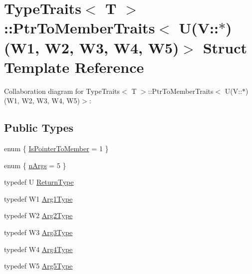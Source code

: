 \hypertarget{structTypeTraits_1_1PtrToMemberTraits_3_01U_07V_1_1_5_08_07W1_00_01W2_00_01W3_00_01W4_00_01W5_08_4}{}\section{Type\+Traits$<$ T $>$\+:\+:Ptr\+To\+Member\+Traits$<$ U(V\+:\+:$\ast$)(W1, W2, W3, W4, W5)$>$ Struct Template Reference}
\label{structTypeTraits_1_1PtrToMemberTraits_3_01U_07V_1_1_5_08_07W1_00_01W2_00_01W3_00_01W4_00_01W5_08_4}


Collaboration diagram for Type\+Traits$<$ T $>$\+:\+:Ptr\+To\+Member\+Traits$<$ U(V\+:\+:$\ast$)(W1, W2, W3, W4, W5)$>$\+:
\subsection*{Public Types}
\begin{DoxyCompactItemize}
\item 
enum \{ \hyperlink{structTypeTraits_1_1PtrToMemberTraits_3_01U_07V_1_1_5_08_07W1_00_01W2_00_01W3_00_01W4_00_01W5_08_4_a1774a75ee65d4a22e4a76f6b80904ff1a335f06acb7c1520df8380fca16d2d220}{Is\+Pointer\+To\+Member} = 1
 \}
\item 
enum \{ \hyperlink{structTypeTraits_1_1PtrToMemberTraits_3_01U_07V_1_1_5_08_07W1_00_01W2_00_01W3_00_01W4_00_01W5_08_4_a56ef725be180ee49a39bf9a41d1f7036a4545a73a28a0c229fa65a7702476efc8}{n\+Args} = 5
 \}
\item 
typedef U \hyperlink{structTypeTraits_1_1PtrToMemberTraits_3_01U_07V_1_1_5_08_07W1_00_01W2_00_01W3_00_01W4_00_01W5_08_4_adaa14f30f7b66ec1134a0e96798b1b8a}{Return\+Type}
\item 
typedef W1 \hyperlink{structTypeTraits_1_1PtrToMemberTraits_3_01U_07V_1_1_5_08_07W1_00_01W2_00_01W3_00_01W4_00_01W5_08_4_a3182e73cd00d90bfdaff55f3f27a5b20}{Arg1\+Type}
\item 
typedef W2 \hyperlink{structTypeTraits_1_1PtrToMemberTraits_3_01U_07V_1_1_5_08_07W1_00_01W2_00_01W3_00_01W4_00_01W5_08_4_ab54ad831fab72bdfdfbd942c15bca42b}{Arg2\+Type}
\item 
typedef W3 \hyperlink{structTypeTraits_1_1PtrToMemberTraits_3_01U_07V_1_1_5_08_07W1_00_01W2_00_01W3_00_01W4_00_01W5_08_4_a9f60e7a49ddc0f06b2e3de29a2a9e613}{Arg3\+Type}
\item 
typedef W4 \hyperlink{structTypeTraits_1_1PtrToMemberTraits_3_01U_07V_1_1_5_08_07W1_00_01W2_00_01W3_00_01W4_00_01W5_08_4_a068c3001efbda429abc908009c8eda9e}{Arg4\+Type}
\item 
typedef W5 \hyperlink{structTypeTraits_1_1PtrToMemberTraits_3_01U_07V_1_1_5_08_07W1_00_01W2_00_01W3_00_01W4_00_01W5_08_4_a59b9d5f46510a26913a3a2a579c4a492}{Arg5\+Type}
\end{DoxyCompactItemize}


